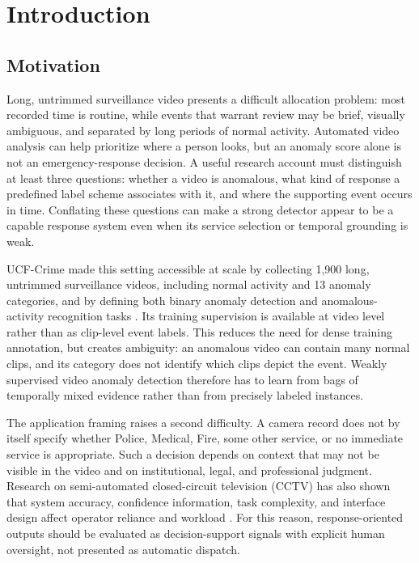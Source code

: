 \chapter{Introduction}
\label{chap:introduction}

\section{Motivation}
\label{sec:introduction-motivation}

Long, untrimmed surveillance video presents a difficult allocation problem: most
recorded time is routine, while events that warrant review may be brief, visually
ambiguous, and separated by long periods of normal activity. Automated video
analysis can help prioritize where a person looks, but an anomaly score alone is
not an emergency-response decision. A useful research account must distinguish
at least three questions: whether a video is anomalous, what kind of response a
predefined label scheme associates with it, and where the supporting event occurs
in time. Conflating these questions can make a strong detector appear to be a
capable response system even when its service selection or temporal grounding is
weak.

UCF-Crime made this setting accessible at scale by collecting 1,900 long,
untrimmed surveillance videos, including normal activity and 13 anomaly
categories, and by defining both binary anomaly detection and anomalous-activity
recognition tasks \cite{sultani2018real}. Its training supervision is available
at video level rather than as clip-level event labels. This reduces the need for
dense training annotation, but creates ambiguity: an anomalous video can contain
many normal clips, and its category does not identify which clips depict the
event. Weakly supervised video anomaly detection therefore has to learn from
bags of temporally mixed evidence rather than from precisely labeled instances.

The application framing raises a second difficulty. A camera record does not by
itself specify whether Police, Medical, Fire, some other service, or no immediate
service is appropriate. Such a decision depends on context that may not be
visible in the video and on institutional, legal, and professional judgment.
Research on semi-automated closed-circuit television (CCTV) has also shown that
system accuracy, confidence information, task complexity, and interface design
affect operator reliance and workload \cite{dadashi2013semiautomated}. For this
reason, response-oriented outputs should be evaluated as decision-support
signals with explicit human oversight, not presented as automatic dispatch.


